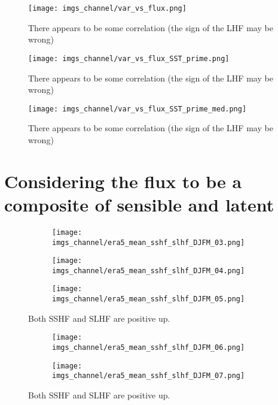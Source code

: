 \documentclass[12pt,a4paper]{article}
\begin{document}
\begin{figure}[h!]
\centering
\texttt{[image: imgs\_channel/var\_vs\_flux.png]}
\caption{There appears to be some correlation (the sign of the LHF may be wrong)}
\end{figure}

\begin{figure}[h!]
\centering
\texttt{[image: imgs\_channel/var\_vs\_flux\_SST\_prime.png]}
\caption{There appears to be some correlation (the sign of the LHF may be wrong)}
\end{figure}

\begin{figure}[h!]
\centering
\texttt{[image: imgs\_channel/var\_vs\_flux\_SST\_prime\_med.png]}
\caption{There appears to be some correlation (the sign of the LHF may be wrong)}
\end{figure}

\section{Considering the flux to be a composite of sensible and latent}

\begin{figure}[h!]
\centering
\begin{subfigure}[t]{\textwidth}
\texttt{[image: imgs\_channel/era5\_mean\_sshf\_slhf\_DJFM\_03.png]}
\end{subfigure}
\begin{subfigure}[t]{\textwidth}
\texttt{[image: imgs\_channel/era5\_mean\_sshf\_slhf\_DJFM\_04.png]}
\end{subfigure}
\begin{subfigure}[t]{\textwidth}
\texttt{[image: imgs\_channel/era5\_mean\_sshf\_slhf\_DJFM\_05.png]}
\end{subfigure}
\caption{Both SSHF and SLHF are positive up.}
\end{figure}
\begin{figure}[h!]
\centering
\begin{subfigure}[t]{\textwidth}
\texttt{[image: imgs\_channel/era5\_mean\_sshf\_slhf\_DJFM\_06.png]}
\end{subfigure}
\begin{subfigure}[t]{\textwidth}
\texttt{[image: imgs\_channel/era5\_mean\_sshf\_slhf\_DJFM\_07.png]}
\end{subfigure}
\caption{Both SSHF and SLHF are positive up.}
\end{figure}
\end{document}
